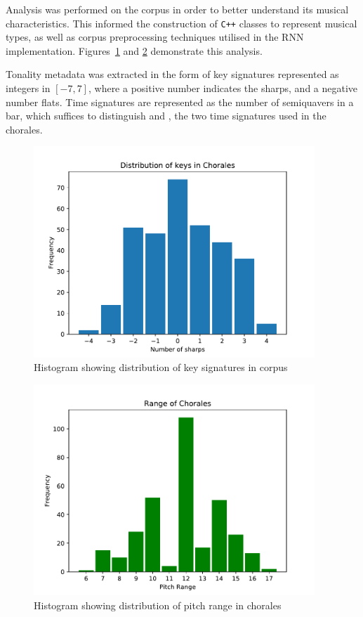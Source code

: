 \documentclass[12pt,a4paper,twoside,openright]{report}
\begin{document}
Analysis was performed on the corpus in order to better understand its musical
characteristics. This informed the construction of \texttt{C++} classes to
represent musical types, as well as corpus preprocessing techniques utilised in
the RNN implementation. Figures~\ref{fig:key-dist} and \ref{fig:range-dist}
demonstrate this analysis.

Tonality metadata was extracted in the form of key signatures represented as
integers in $[-7,7]$, where a positive number indicates the sharps, and a
negative number flats. Time signatures are represented as the number of
semiquavers in a bar, which suffices to distinguish  and
, the two time signatures used in the chorales.

\begin{figure}[H]
\centering
\includegraphics[width=300pt]{figs/key_dist.pdf}
\caption{Histogram showing distribution of key signatures in corpus}
\label{fig:key-dist}
\end{figure}

\begin{figure}[H]
\centering
\includegraphics[width=300pt]{figs/range_dist.pdf}
\caption{Histogram showing distribution of pitch range in chorales}
\label{fig:range-dist}
\end{figure}
\end{document}
